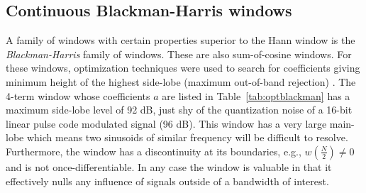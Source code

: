 \subsection{Continuous Blackman-Harris windows}

A family of windows with certain properties superior to the Hann window is the
\textit{Blackman-Harris} family of windows. These are also sum-of-cosine
windows. For these windows, optimization techniques were used to search for
coefficients giving minimum height of the highest side-lobe (maximum out-of-band
rejection) \cite{rabiner1970approach}. The 4-term window whose coefficients $a$
are listed in Table~\ref{tab:optblackman} has a maximum side-lobe level of 92
dB, just shy of the quantization noise of a 16-bit linear pulse code modulated
signal (96 dB). This window has a very large main-lobe which means two sinusoids of
similar frequency will be difficult to resolve. Furthermore, the window has a
discontinuity at its boundaries, e.g., $w \left( \frac{N}{2} \right) \neq 0$ and
is not once-differentiable. In any case the window is valuable in that it
effectively nulls any influence of signals outside of a bandwidth of interest.

